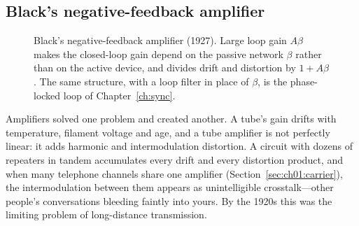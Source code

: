 \subsection{Black's negative-feedback amplifier}
\label{sec:ch01:feedback}

\begin{figure}[htbp]\centering
{}
\caption{Black's negative-feedback amplifier (1927). Large loop gain $A\beta$ makes the closed-loop
gain depend on the passive network $\beta$ rather than on the active device, and divides drift and
distortion by $1+A\beta$. The same structure, with a loop filter in place of $\beta$, is the
phase-locked loop of Chapter~\ref{ch:sync}.}
\label{fig:ch01_feedback}
\end{figure}

Amplifiers solved one problem and created another. A tube's gain drifts with temperature, filament
voltage and age, and a tube amplifier is not perfectly linear: it adds harmonic and intermodulation
distortion. A circuit with dozens of repeaters in tandem accumulates every drift and every distortion
product, and when many telephone channels share one amplifier (Section~\ref{sec:ch01:carrier}), the
intermodulation between them appears as unintelligible crosstalk---other people's conversations
bleeding faintly into yours. By the 1920s this was the limiting problem of long-distance transmission.

